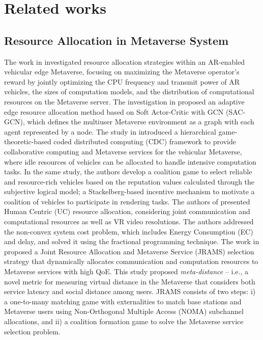\section{Related works}
\subsection{Resource Allocation in Metaverse System}
The work in \cite{10250875} investigated resource allocation strategies within an AR-enabled vehicular edge Metaverse, focusing on maximizing the Metaverse operator's reward by jointly optimizing the CPU frequency and transmit power of AR vehicles, the sizes of computation models, and the distribution of computational resources on the Metaverse server.
  The investigation in \cite{10144631} proposed an adaptive edge resource allocation method based on Soft Actor-Critic with GCN (SAC-GCN), which defines the multiuser Metaverse environment as a graph with each agent represented by a node. The study in \cite{9880566} introduced a hierarchical game-theoretic-based coded distributed computing (CDC) framework to provide collaborative computing and Metaverse services for the vehicular Metaverse, where idle resources of vehicles can be allocated to handle intensive computation tasks. In the same study, the authors develop a coalition game to select reliable and resource-rich vehicles based on the reputation values calculated through the subjective logical model; a Stackelberg-based incentive mechanism to motivate a coalition of vehicles to participate in rendering tasks. 
  The authors of \cite{10368052} presented Human Centric (UC) resource allocation, considering joint communication and computational resources as well as VR video resolutions. The authors addressed the non-convex system cost problem, which includes Energy Consumption (EC) and delay, and solved it using the fractional programming technique. The work in \cite{10148094} proposed a Joint Resource Allocation and Metaverse Service (JRAMS) selection strategy that dynamically allocates communication and computation resources to Metaverse services with high QoE. This study proposed \textit{meta-distance} -- i.e., a novel metric for measuring virtual distance in the Metaverse that considers both service latency and social distance among users. JRAMS consists of two steps: i) a one-to-many matching game with externalities to match base stations and Metaverse users using Non-Orthogonal Multiple Access (NOMA) subchannel allocations, and ii) a coalition formation game to solve the Metaverse service selection problem. 
